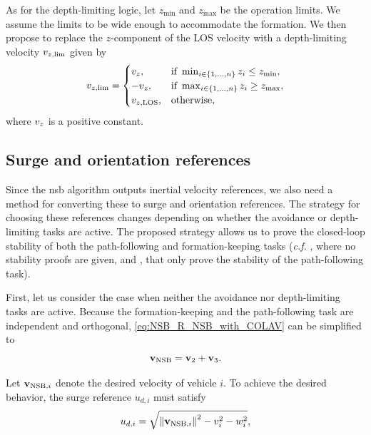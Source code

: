 As for the depth-limiting logic,
let $z_{\min}$ and $z_{\max}$ be the operation limits.
We assume the limits to be wide enough to accommodate the formation.
We then propose to replace the $z$-component of the LOS velocity with a depth-limiting velocity $v_{z, {\rm lim}}$ given by 
\begin{equation}
    v_{z, {\rm lim}} = \begin{cases}
        v_z, & \text{if } \min_{i \in \{1, \ldots, n\}} z_i \leq z_{\min}, \\
        -v_z, & \text{if } \max_{i \in \{1, \ldots, n\}} z_i \geq z_{\max}, \\
        v_{z, {\rm LOS}}, & \text{otherwise},
    \end{cases}
\end{equation}
where $v_z$ is a positive constant.


\subsection{Surge and orientation references}
\label{sec:NSB_R_references}

Since the \gls{nsb} algorithm outputs inertial velocity references, we also need a method for converting these to surge and orientation references.
The strategy for choosing these references changes depending on whether the avoidance or depth-limiting tasks are active.
The proposed strategy allows us to prove the closed-loop stability of both the path-following and formation-keeping tasks (\emph{c.f.} \cite{arrichiello_formation_2006}, where no stability proofs are given, and \cite{eek_formation_2021,matouvs_formation_2022}, that only prove the stability of the path-following task).



First, let us consider the case when neither the avoidance nor depth-limiting tasks are active.
Because the formation-keeping and the path-following task are independent and orthogonal, \eqref{eq:NSB_R_NSB_with_COLAV} can be simplified to 
\begin{equation}
    \mathbf{v}_{\rm NSB} = \mathbf{v}_2 + \mathbf{v}_3.
    \label{eq:NSB_R_NSB_nominal_simplified}
\end{equation}


\noindent Let $\mathbf{v}_{{\rm NSB}, i}$ denote the desired velocity of vehicle $i$.    
To achieve the desired behavior, the surge reference $u_{d, i}$ must satisfy 
\begin{equation}
    u_{d, i} = \sqrt{\left\|\mathbf{v}_{{\rm NSB}, i}\right\|^2 - v_i^2 - w_i^2},
    \label{eq:NSB_R_surge_reference}
\end{equation}


